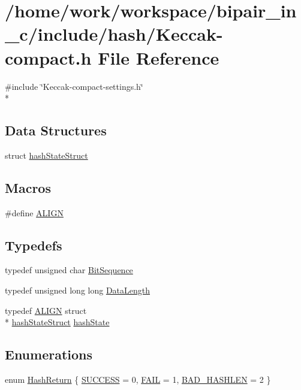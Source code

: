 \hypertarget{Keccak-compact_8h}{\section{/home/work/workspace/bipair\-\_\-in\-\_\-c/include/hash/\-Keccak-\/compact.h File Reference}
\label{Keccak-compact_8h}
}
{\ttfamily \#include \char`\"{}Keccak-\/compact-\/settings.\-h\char`\"{}}\\*
\subsection*{Data Structures}
\begin{DoxyCompactItemize}
\item 
struct \hyperlink{structhashStateStruct}{hash\-State\-Struct}
\end{DoxyCompactItemize}
\subsection*{Macros}
\begin{DoxyCompactItemize}
\item 
\#define \hyperlink{Keccak-compact_8h_ae4ff5a07c6ff43ed11a3887ef7d524f2}{A\-L\-I\-G\-N}
\end{DoxyCompactItemize}
\subsection*{Typedefs}
\begin{DoxyCompactItemize}
\item 
typedef unsigned char \hyperlink{Keccak-compact_8h_ac7449f64e35526a4e70f37cbc40ecc65}{Bit\-Sequence}
\item 
typedef unsigned long long \hyperlink{Keccak-compact_8h_aa1c06fb4773a4b043c077daf86fb9d87}{Data\-Length}
\item 
typedef \hyperlink{Keccak-compact_8h_ae4ff5a07c6ff43ed11a3887ef7d524f2}{A\-L\-I\-G\-N} struct \\*
\hyperlink{structhashStateStruct}{hash\-State\-Struct} \hyperlink{Keccak-compact_8h_a6cd75f9e7106362b1576ff73d4cc6a3b}{hash\-State}
\end{DoxyCompactItemize}
\subsection*{Enumerations}
\begin{DoxyCompactItemize}
\item 
enum \hyperlink{Keccak-compact_8h_a8291024a9e890d5d4d60dc3c76d2b44c}{Hash\-Return} \{ \hyperlink{Keccak-compact_8h_a8291024a9e890d5d4d60dc3c76d2b44cac7f69f7c9e5aea9b8f54cf02870e2bf8}{S\-U\-C\-C\-E\-S\-S} = 0, 
\hyperlink{Keccak-compact_8h_a8291024a9e890d5d4d60dc3c76d2b44ca936c4a5547a9360243178f726f6b2715}{F\-A\-I\-L} = 1, 
\hyperlink{Keccak-compact_8h_a8291024a9e890d5d4d60dc3c76d2b44caf4c78135fbd21ec54dcd0907004f1040}{B\-A\-D\-\_\-\-H\-A\-S\-H\-L\-E\-N} = 2
 \}
\end{DoxyCompactItemize}
